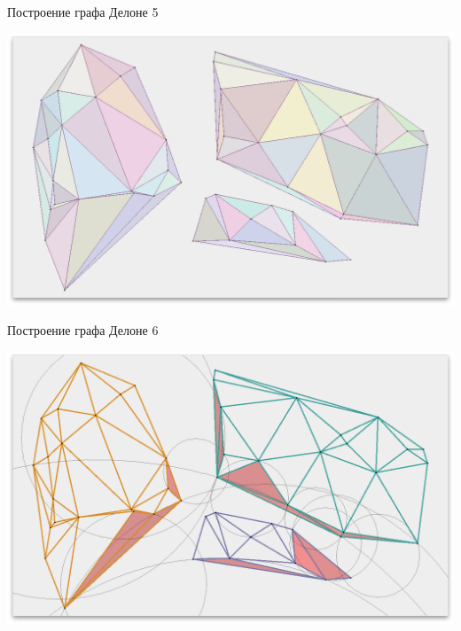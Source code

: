 \documentclass[14pt, fleqn, xcolor={dvipsnames, table}]{beamer}
\begin{document}
        \begin{frame}{Построение графа Делоне 5}
            \begin{center}
                \includegraphics[scale=0.295]{5.png}
            \end{center}            
        \end{frame}
        
        \begin{frame}{Построение графа Делоне 6}
            \begin{center}
                \includegraphics[scale=0.295]{6.png}
            \end{center}            
        \end{frame}
        
\end{document}
